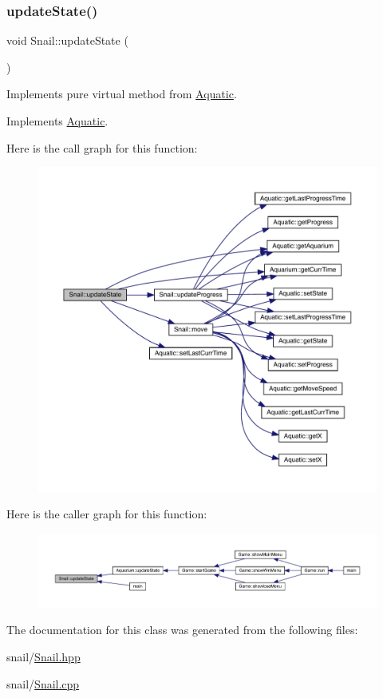 \subsubsection{\texorpdfstring{update\+State()}{updateState()}}
{\footnotesize\ttfamily void Snail\+::update\+State (\begin{DoxyParamCaption}{ }\end{DoxyParamCaption})\hspace{0.3cm}{\ttfamily [virtual]}}



Implements pure virtual method from \mbox{\hyperlink{class_aquatic}{Aquatic}}. 



Implements \mbox{\hyperlink{class_aquatic_a51e44c95476d72a841fea667c6cbbedc}{Aquatic}}.

Here is the call graph for this function\+:\nopagebreak
\begin{figure}[H]
\begin{center}
\leavevmode
\includegraphics[width=350pt]{class_snail_a46dbefb10308c29341d96423e853cb2b_cgraph}
\end{center}
\end{figure}
Here is the caller graph for this function\+:
\nopagebreak
\begin{figure}[H]
\begin{center}
\leavevmode
\includegraphics[width=350pt]{class_snail_a46dbefb10308c29341d96423e853cb2b_icgraph}
\end{center}
\end{figure}


The documentation for this class was generated from the following files\+:\begin{DoxyCompactItemize}
\item 
snail/\mbox{\hyperlink{_snail_8hpp}{Snail.\+hpp}}\item 
snail/\mbox{\hyperlink{_snail_8cpp}{Snail.\+cpp}}\end{DoxyCompactItemize}
